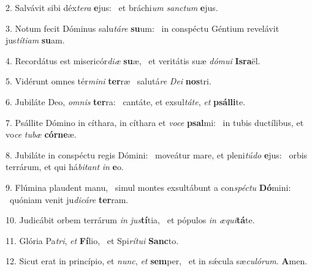 2. Salvávit sibi déx\textit{te}\textit{ra} \textbf{e}jus: \ast\  et bráchi\textit{um} \textit{sanc}\textit{tum} \textbf{e}jus.\

3. Notum fecit Dóminus salu\textit{tá}\textit{re} \textbf{su}um: \ast\  in conspéctu Géntium revelávit jus\textit{tí}\textit{ti}\textit{am} \textbf{su}am.\

4. Recordátus est misericór\textit{di}\textit{æ} \textbf{su}æ, \ast\  et veritátis suæ \textit{dó}\textit{mu}\textit{i} \textbf{Is}\textbf{ra}ël.\

5. Vidérunt omnes tér\textit{mi}\textit{ni} \textbf{ter}ræ \ast\  salutá\textit{re} \textit{De}\textit{i} \textbf{nos}tri.\

6. Jubiláte Deo, \textit{om}\textit{nis} \textbf{ter}ra: \ast\  cantáte, et exsul\textit{tá}\textit{te}, \textit{et} \textbf{psál}\textbf{li}te.\

7. Psállite Dómino in cíthara, in cíthara et \textit{vo}\textit{ce} \textbf{psal}mi: \ast\  in tubis ductílibus, et vo\textit{ce} \textit{tu}\textit{bæ} \textbf{cór}\textbf{ne}æ.\

8. Jubiláte in conspéctu regis Dómini: \dag\  moveátur mare, et pleni\textit{tú}\textit{do} \textbf{e}jus: \ast\  orbis terrárum, et qui há\textit{bi}\textit{tant} \textit{in} \textbf{e}o.\

9. Flúmina plaudent manu, \dag\  simul montes exsultábunt a con\textit{spéc}\textit{tu} \textbf{Dó}mini: \ast\  quóniam venit ju\textit{di}\textit{cá}\textit{re} \textbf{ter}ram.\

10. Judicábit orbem terrárum \textit{in} \textit{jus}\textbf{tí}tia, \ast\  et pópulos \textit{in} \textit{æ}\textit{qui}\textbf{tá}te.\

11. Glória Pa\textit{tri}, \textit{et} \textbf{Fí}lio, \ast\  et Spi\textit{rí}\textit{tu}\textit{i} \textbf{Sanc}to.\

12. Sicut erat in princípio, et \textit{nunc}, \textit{et} \textbf{sem}per, \ast\  et in sǽcula sæ\textit{cu}\textit{ló}\textit{rum}. \textbf{A}men.\


